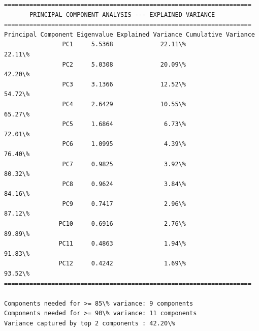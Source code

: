\documentclass[11pt]{article}
\begin{document}
    \begin{Verbatim}[commandchars=\\\{\}]
====================================================================
       PRINCIPAL COMPONENT ANALYSIS --- EXPLAINED VARIANCE
====================================================================
Principal Component Eigenvalue Explained Variance Cumulative Variance
                PC1     5.5368             22.11\%              22.11\%
                PC2     5.0308             20.09\%              42.20\%
                PC3     3.1366             12.52\%              54.72\%
                PC4     2.6429             10.55\%              65.27\%
                PC5     1.6864              6.73\%              72.01\%
                PC6     1.0995              4.39\%              76.40\%
                PC7     0.9825              3.92\%              80.32\%
                PC8     0.9624              3.84\%              84.16\%
                PC9     0.7417              2.96\%              87.12\%
               PC10     0.6916              2.76\%              89.89\%
               PC11     0.4863              1.94\%              91.83\%
               PC12     0.4242              1.69\%              93.52\%
====================================================================

Components needed for >= 85\% variance: 9 components
Components needed for >= 90\% variance: 11 components
Variance captured by top 2 components : 42.20\%
    \end{Verbatim}
\end{document}

